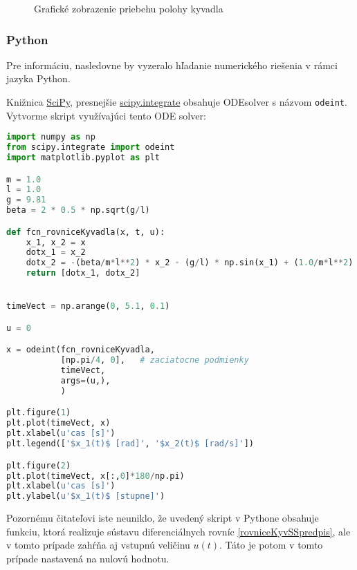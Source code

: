 \documentclass[a4paper, 10pt, ]{article}
\begin{document}
\begin{figure}[!ht]
	\centering


    \vspace{-1mm}

	\caption{Grafické zobrazenie priebehu polohy kyvadla}
	\label{cv2obr2}
\end{figure}






\subsubsection{Python}

Pre informáciu, nasledovne by vyzeralo hľadanie numerického riešenia v rámci jazyka Python.


Knižnica \href{https://www.scipy.org/}{\color{NavyBlue} SciPy}, presnejšie \href{https://docs.scipy.org/doc/scipy-0.18.1/reference/integrate.html}{\color{NavyBlue} scipy.integrate} obsahuje ODEsolver s názvom \verb|odeint|. Vytvorme skript využívajúci tento ODE solver:


\begin{lstlisting}[language=Python, title=Skript v Python-e]
import numpy as np
from scipy.integrate import odeint
import matplotlib.pyplot as plt

m = 1.0
l = 1.0
g = 9.81
beta = 2 * 0.5 * np.sqrt(g/l)

def fcn_rovniceKyvadla(x, t, u):
    x_1, x_2 = x
    dotx_1 = x_2
    dotx_2 = -(beta/m*l**2) * x_2 - (g/l) * np.sin(x_1) + (1.0/m*l**2) * u
    return [dotx_1, dotx_2]


timeVect = np.arange(0, 5.1, 0.1)

u = 0

x = odeint(fcn_rovniceKyvadla,
           [np.pi/4, 0],   # zaciatocne podmienky
           timeVect,
           args=(u,),
           )

plt.figure(1)
plt.plot(timeVect, x)
plt.xlabel(u'cas [s]')
plt.legend(['$x_1(t)$ [rad]', '$x_2(t)$ [rad/s]'])

plt.figure(2)
plt.plot(timeVect, x[:,0]*180/np.pi)
plt.xlabel(u'cas [s]')
plt.ylabel(u'$x_1(t)$ [stupne]')
\end{lstlisting}


Pozornému čitateľovi iste neuniklo, že uvedený skript v Pythone obsahuje funkciu, ktorá realizuje sústavu diferenciálnych rovníc \eqref{rovniceKyvSSpredpis}, ale v tomto prípade zahŕňa aj vstupnú veličinu $u(t)$. Táto je potom v tomto prípade nastavená na nulovú hodnotu.
\end{document}
